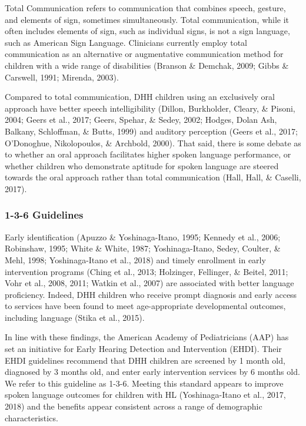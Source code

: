 \documentclass[english,man]{apa6}
\begin{document}
Total Communication refers to communication that combines speech, gesture, and elements of sign, sometimes simultaneously. Total communication, while it often includes elements of sign, such as individual signs, is not a sign language, such as American Sign Language. Clinicians currently employ total communication as an alternative or augmentative communication method for children with a wide range of disabilities (Branson \& Demchak, 2009; Gibbs \& Carswell, 1991; Mirenda, 2003).

Compared to total communication, DHH children using an exclusively oral approach have better speech intelligibility (Dillon, Burkholder, Cleary, \& Pisoni, 2004; Geers et al., 2017; Geers, Spehar, \& Sedey, 2002; Hodges, Dolan Ash, Balkany, Schloffman, \& Butts, 1999) and auditory perception (Geers et al., 2017; O'Donoghue, Nikolopoulos, \& Archbold, 2000). That said, there is some debate as to whether an oral approach facilitates higher spoken language performance, or whether children who demonstrate aptitude for spoken language are steered towards the oral approach rather than total communication (Hall, Hall, \& Caselli, 2017).

\hypertarget{guidelines}{%
\subsubsection{1-3-6 Guidelines}\label{guidelines}}

Early identification (Apuzzo \& Yoshinaga-Itano, 1995; Kennedy et al., 2006; Robinshaw, 1995; White \& White, 1987; Yoshinaga-Itano, Sedey, Coulter, \& Mehl, 1998; Yoshinaga-Itano et al., 2018) and timely enrollment in early intervention programs (Ching et al., 2013; Holzinger, Fellinger, \& Beitel, 2011; Vohr et al., 2008, 2011; Watkin et al., 2007) are associated with better language proficiency. Indeed, DHH children who receive prompt diagnosis and early access to services have been found to meet age-appropriate developmental outcomes, including language (Stika et al., 2015).

In line with these findings, the American Academy of Pediatricians (AAP) has set an initiative for Early Hearing Detection and Intervention (EHDI). Their EHDI guidelines recommend that DHH children are screened by 1 month old, diagnosed by 3 months old, and enter early intervention services by 6 months old. We refer to this guideline as 1-3-6. Meeting this standard appears to improve spoken language outcomes for children with HL (Yoshinaga-Itano et al., 2017, 2018) and the benefits appear consistent across a range of demographic characteristics.
\end{document}
